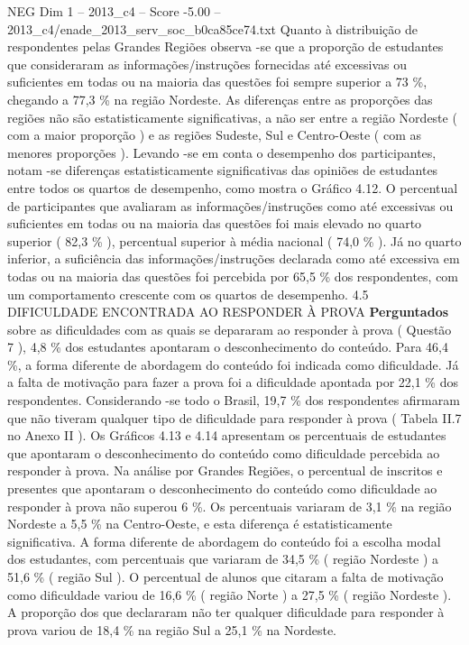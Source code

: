 \begin{textsample}{NEG Dim 1 – 2013\_c4 – Score -5.00 – 2013\_c4/enade\_2013\_serv\_soc\_b0ca85ce74.txt}
Quanto à distribuição de respondentes pelas Grandes Regiões observa -se que a proporção de estudantes que consideraram as informações/instruções fornecidas até excessivas ou suficientes em todas ou na maioria das questões foi sempre superior a 73 \%, chegando a 77,3 \% na região Nordeste.
As diferenças entre as proporções das regiões não são estatisticamente significativas, a não ser entre a região Nordeste ( com a maior proporção ) e as regiões Sudeste, Sul e Centro-Oeste ( com as menores proporções ).
Levando -se em conta o desempenho dos participantes, notam -se diferenças estatisticamente significativas das opiniões de estudantes entre todos os quartos de desempenho, como mostra o Gráfico 4.12.
O percentual de participantes que avaliaram as informações/instruções como até excessivas ou suficientes em todas ou na maioria das questões foi mais elevado no quarto superior ( 82,3 \% ), percentual superior à média nacional ( 74,0 \% ).
Já no quarto inferior, a suficiência das informações/instruções declarada como até excessiva em todas ou na maioria das questões foi percebida por 65,5 \% dos respondentes, com um comportamento crescente com os quartos de desempenho. 4.5 DIFICULDADE ENCONTRADA AO RESPONDER À PROVA \textbf{Perguntados} sobre as dificuldades com as quais se depararam ao responder à prova ( Questão 7 ), 4,8 \% dos estudantes apontaram o desconhecimento do conteúdo.
Para 46,4 \%, a forma diferente de abordagem do conteúdo foi indicada como dificuldade.
Já a falta de motivação para fazer a prova foi a dificuldade apontada por 22,1 \% dos respondentes.
Considerando -se todo o Brasil, 19,7 \% dos respondentes afirmaram que não tiveram qualquer tipo de dificuldade para responder à prova ( Tabela II.7 no Anexo II ).
Os Gráficos 4.13 e 4.14 apresentam os percentuais de estudantes que apontaram o desconhecimento do conteúdo como dificuldade percebida ao responder à prova.
Na análise por Grandes Regiões, o percentual de inscritos e presentes que apontaram o desconhecimento do conteúdo como dificuldade ao responder à prova não superou 6 \%.
Os percentuais variaram de 3,1 \% na região Nordeste a 5,5 \% na Centro-Oeste, e esta diferença é estatisticamente significativa.
A forma diferente de abordagem do conteúdo foi a escolha modal dos estudantes, com percentuais que variaram de 34,5 \% ( região Nordeste ) a 51,6 \% ( região Sul ).
O percentual de alunos que citaram a falta de motivação como dificuldade variou de 16,6 \% ( região Norte ) a 27,5 \% ( região Nordeste ).
A proporção dos que declararam não ter qualquer dificuldade para responder à prova variou de 18,4 \% na região Sul a 25,1 \% na Nordeste.

\end{textsample}
